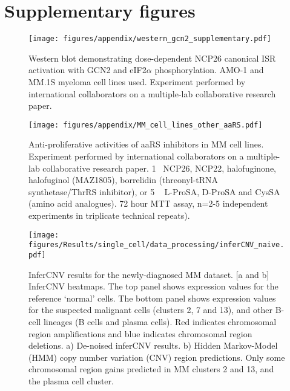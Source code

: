 \chapter{Supplementary figures}

\begin{figure}[ht]
\centering
\texttt{[image: figures/appendix/western\_gcn2\_supplementary.pdf]}
\caption[GCN2 and eIF2$\alpha$ western blot ]{Western blot demonstrating dose-dependent NCP26 canonical ISR activation with GCN2 and eIF2$\alpha$ phosphorylation. AMO-1 and MM.1S myeloma cell lines used.
Experiment performed by international collaborators on a multiple-lab collaborative research paper\cite{bottpreclinical2022}.
}
\label{fig:sup_western}
\end{figure}

\begin{figure}[ht]
\centering
\texttt{[image: figures/appendix/MM\_cell\_lines\_other\_aaRS.pdf]}
\caption[aaRS inhibitors anti-proliferative activity in MM cell lines]{Anti-proliferative activities of aaRS inhibitors in MM cell lines.
Experiment performed by international collaborators on a multiple-lab collaborative research paper\cite{bottpreclinical2022}.
1\si{\micro\Molar} NCP26, NCP22, halofuginone, halofuginol (MAZ1805), borrelidin (threonyl-tRNA synthetase/ThrRS inhibitor), or 5 \si{\micro\Molar} L-ProSA, D-ProSA and CysSA (amino acid analogues).
72 hour MTT assay, n=2-5 independent experiments in triplicate technical repeats).
}
\label{fig:sup_cell_line_aaRS}
\end{figure}



\begin{figure}[htb]
    \centering
    \texttt{[image: figures/Results/single\_cell/data\_processing/inferCNV\_naive.pdf]}
    \caption[inferCNV- newly-diagnosed MM]{InferCNV results for the newly-diagnosed MM dataset.
    [a and b] InferCNV heatmaps.
        The top panel shows expression values for the reference `normal' cells.
        The bottom panel shows expression values for the suspected malignant cells (clusters 2, 7 and 13), and other B-cell lineages (B cells and plasma cells).
        Red indicates chromosomal region amplifications and blue indicates chromosomal region deletions.
    a) De-noised inferCNV results.
    b) Hidden Markov-Model (HMM) copy number variation (CNV) region predictions.
        Only some chromosomal region gains predicted in MM clusters 2 and 13, and the plasma cell cluster.
    }
    \label{fig:inferCNV_naive}
\end{figure}
%